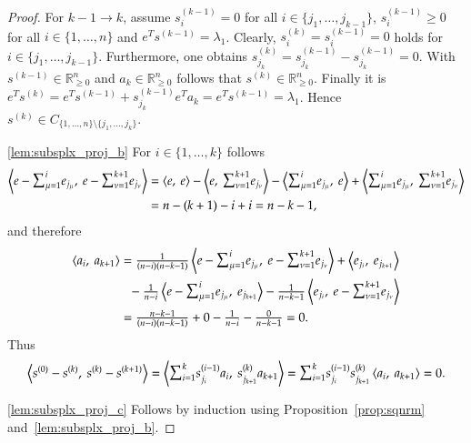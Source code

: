 \documentclass[twoside,11pt]{article}
\newcommand{\R}{\mathbb{R}}
\newcommand{\0}{\mathcal{O}}
\newcommand{\transp}{^T}
\newcommand{\scp}[2]{\left<#1,\ #2\right>}
\newcommand{\discint}[2]{\{#1,\dotsc,#2\}}
\newcommand{\inint}[2]{\in\discint{#1}{#2}}
\newcommand{\smallsum}{\scalebox{1.2}{$\sum$}}
\begin{document}
\begin{proof}
For $k - 1\to k$, assume $s^{(k-1)}_i = 0$ for all $i\inint{j_1}{j_{k-1}}$, $s^{(k-1)}_i \geq 0$ for all $i\inint{1}{n}$ and $e\transp s^{(k-1)} = \lambda_1$.
Clearly, $s^{(k)}_i = s^{(k-1)}_i = 0$ holds for $i\inint{j_1}{j_{k-1}}$.
Furthermore, one obtains $s^{(k)}_{j_k} = s^{(k-1)}_{j_k} - s^{(k-1)}_{j_k} = 0$.
With $s^{(k-1)}\in\R_{\geq 0}^n$ and $a_k\in\R_{\geq 0}^n$ follows that $s^{(k)}\in\R_{\geq 0}^n$.
Finally it is $e\transp s^{(k)} = e\transp s^{(k-1)} + s^{(k-1)}_{j_k} e\transp a_k = e\transp s^{(k-1)} = \lambda_1$.
Hence $s^{(k)}\in C_{\discint{1}{n}\setminus\discint{j_1}{j_k}}$.

\ref{lem:subsplx_proj_b}
For $i\inint{1}{k}$ follows
\begin{align*}
  \scp{e - \smallsum_{\mu=1}^{i}e_{j_\mu}}{e - \smallsum_{\nu=1}^{k+1}e_{j_\nu}}
  &= \scp{e}{e} - \scp{e}{\smallsum_{\nu=1}^{k+1}e_{j_\nu}} -\scp{\smallsum_{\mu=1}^{i}e_{j_\mu}}{e} + \scp{\smallsum_{\mu=1}^{i}e_{j_\mu}}{\smallsum_{\nu=1}^{k+1}e_{j_\nu}}\\
  &= n - (k + 1) - i + i = n - k - 1\text{,}
\end{align*}
and therefore
\begin{align*}
  \scp{a_i}{a_{k+1}}
  &= \tfrac{1}{\left(n-i\right)\left(n-k-1\right)}\scp{e - \smallsum_{\mu=1}^{i}e_{j_\mu}}{e - \smallsum_{\nu=1}^{k+1}e_{j_\nu}}
     + \scp{e_{j_i}}{e_{j_{k+1}}}\\
  &\phantom{=} - \tfrac{1}{n-i}\scp{e - \smallsum_{\mu=1}^{i}e_{j_\mu}}{e_{j_{k+1}}}
     - \tfrac{1}{n-k-1}\scp{e_{j_i}}{e - \smallsum_{\nu=1}^{k+1}e_{j_\nu}}\\
  &= \tfrac{n-k-1}{\left(n-i\right)\left(n-k-1\right)} + 0 - \tfrac{1}{n-i} - \tfrac{0}{n-k-1}
  = 0\text{.}
\end{align*}
Thus
\begin{displaymath}
  \scp{s^{(0)} - s^{(k)}}{s^{(k)} - s^{(k+1)}}
  = \scp{\smallsum_{i=1}^{k}s^{(i-1)}_{j_i}a_i}{s^{(k)}_{j_{k+1}}a_{k+1}}
  = \smallsum_{i=1}^{k}s^{(i-1)}_{j_i}s^{(k)}_{j_{k+1}}\scp{a_i}{a_{k+1}}
  = 0\text{.}
\end{displaymath}

\ref{lem:subsplx_proj_c}
Follows by induction using Proposition~\ref{prop:sqnrm} and~\ref{lem:subsplx_proj_b}.


\end{proof}
\end{document}
